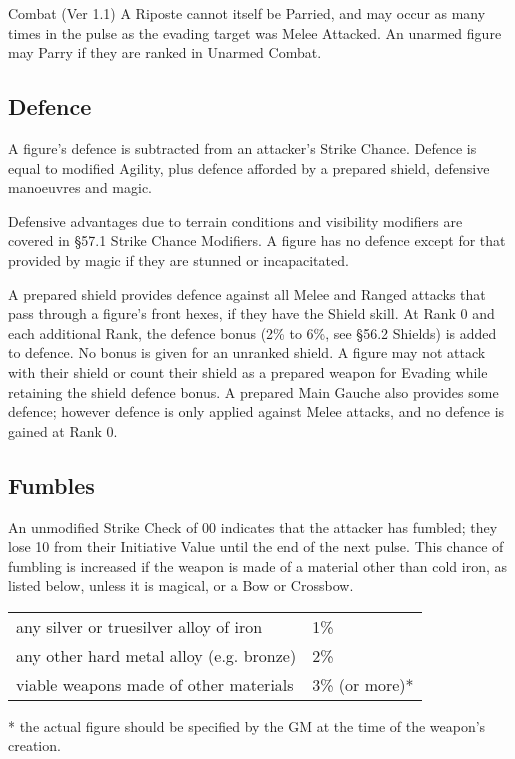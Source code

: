 \begin{Chapter}{Combat (Ver 1.1)}
A Riposte cannot itself be Parried, and may occur as many times in the
pulse as the evading target was Melee Attacked. An unarmed figure may
Parry if they are ranked in Unarmed Combat.

\subsection{Defence}

A figure’s defence is subtracted from an attacker’s Strike Chance.
Defence is equal to modified Agility, plus defence afforded by a
prepared shield, defensive manoeuvres and magic.

Defensive advantages due to terrain conditions and visibility
modifiers are covered in §57.1 Strike Chance Modifiers. A figure has
no defence except for that provided by magic if they are stunned or
incapacitated.

A prepared shield provides defence against all Melee and Ranged
attacks that pass through a figure’s front hexes, if they have the
Shield skill.  At Rank 0 and each additional Rank, the defence bonus
(2\% to 6\%, see §56.2 Shields) is added to defence. No bonus is given
for an unranked shield.  A figure may not attack with their shield or
count their shield as a prepared weapon for Evading while retaining
the shield defence bonus.  A prepared Main Gauche also provides some
defence; however defence is only applied against Melee attacks, and no
defence is gained at Rank 0.

\subsection{Fumbles}

An unmodified Strike Check of 00 indicates that the attacker has
fumbled; they lose 10 from their Initiative Value until the end of the
next pulse. This chance of fumbling is increased if the weapon is made
of a material other than cold iron, as listed below, unless it is
magical, or a Bow or Crossbow.

\begin{tabularx}{\columnwidth}{Xl}
any silver or truesilver alloy of iron		& 1\% \\
any other hard metal alloy (e.g. bronze)	& 2\% \\ 
viable weapons made of other materials		& 3\% (or more)* \\
\end{tabularx}

* the actual figure should be specified by the GM at the time of the
weapon’s creation.



\end{Chapter}
